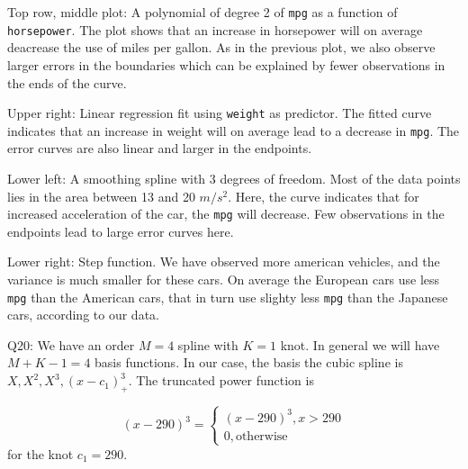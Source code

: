 \documentclass[]{article}
\begin{document}
Top row, middle plot: A polynomial of degree 2 of \texttt{mpg} as a
function of \texttt{horsepower}. The plot shows that an increase in
horsepower will on average deacrease the use of miles per gallon. As in
the previous plot, we also observe larger errors in the boundaries which
can be explained by fewer observations in the ends of the curve.

Upper right: Linear regression fit using \texttt{weight} as predictor.
The fitted curve indicates that an increase in weight will on average
lead to a decrease in \texttt{mpg}. The error curves are also linear and
larger in the endpoints.

Lower left: A smoothing spline with 3 degrees of freedom. Most of the
data points lies in the area between 13 and 20 \(m/s^2\). Here, the
curve indicates that for increased acceleration of the car, the
\texttt{mpg} will decrease. Few observations in the endpoints lead to
large error curves here.

Lower right: Step function. We have observed more american vehicles, and
the variance is much smaller for these cars. On average the European
cars use less \texttt{mpg} than the American cars, that in turn use
slighty less \texttt{mpg} than the Japanese cars, according to our data.

Q20: We have an order \(M=4\) spline with \(K=1\) knot. In general we
will have \(M+K-1=4\) basis functions. In our case, the basis the cubic
spline is \(X,X^2,X^3,(x-c_1)_+^3\). The truncated power function is

\[
(x-290)^3= \begin{cases}(x-290)^3, x>290 \\
0, \text{otherwise}
\end{cases}
\] for the knot \(c_1=290\).
\end{document}

